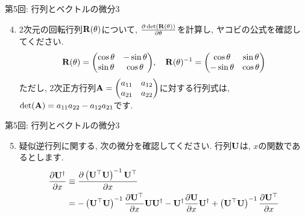 \documentclass[dvipdfmx,notheorems,t]{beamer}
\begin{document}
\begin{frame}{第5回: 行列とベクトルの微分3}
\begin{enumerate}
  \setcounter{enumi}{3}
  \item 2次元の回転行列$\vb{R}(\theta)$について, $\pdv{\det(\vb{R}(\theta))}{\theta}$を計算し,
  ヤコビの公式を確認してください.
  \begin{align*}
    \vb{R}(\theta) = \mqty(\cos \theta & -\sin \theta \\ \sin \theta & \cos \theta), \quad
    \vb{R}(\theta)^{-1} = \mqty(\cos \theta & \sin \theta \\ -\sin \theta & \cos \theta)
  \end{align*}
  ただし, 2次正方行列$\vb{A} = \mqty(a_{11} & a_{12} \\ a_{21} & a_{22})$に対する行列式は,
  $\det(\vb{A}) = a_{11} a_{22} - a_{12} a_{21}$です.
\end{enumerate}
\end{frame}

\begin{frame}{第5回: 行列とベクトルの微分3}
\begin{enumerate}
  \setcounter{enumi}{4}
  \item 疑似逆行列に関する, 次の微分を確認してください.
  行列$\vb{U}$は, $x$の関数であるとします.
  \begin{align*}
    \pdv{\vb{U}^\dagger}{x} &\equiv
      \pdv{\left( \vb{U}^\top \vb{U} \right)^{-1} \vb{U}^\top}{x} \\
    &= -\left( \vb{U}^\top \vb{U} \right)^{-1} \pdv{\vb{U}^\top}{x} \vb{U} \vb{U}^\dagger
      - \vb{U}^\dagger \pdv{\vb{U}}{x} \vb{U}^\dagger
      + \left( \vb{U}^\top \vb{U} \right)^{-1} \pdv{\vb{U}^\top}{x}
  \end{align*}
\end{enumerate}
\end{frame}
\end{document}
